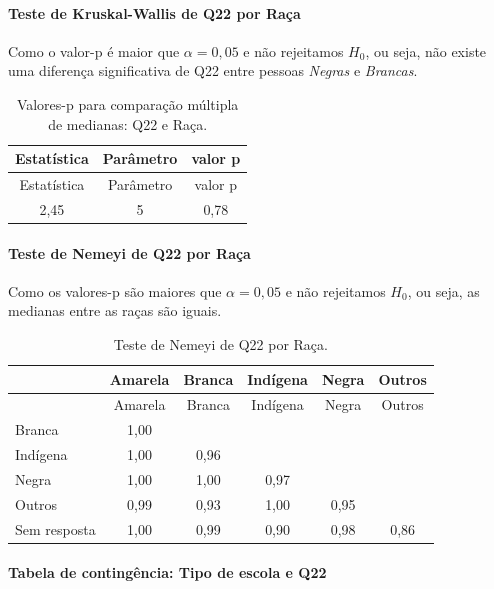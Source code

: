 \documentclass[]{article}
\let\oldparagraph\paragraph
\renewcommand{\paragraph}[1]{\oldparagraph{#1}\mbox{}}
\begin{document}
\hypertarget{teste-de-kruskal-wallis-de-q22-por-rauxe7a}{%
\paragraph{Teste de Kruskal-Wallis de Q22 por Raça}\label{teste-de-kruskal-wallis-de-q22-por-rauxe7a}}

Como o valor-p é maior que \(\alpha=0,05\) e não rejeitamos \(H_0\), ou seja, não existe uma diferença significativa de Q22 entre pessoas \emph{Negras} e \emph{Brancas}.

\begin{longtable}[]{@{}ccc@{}}
\caption{\label{tab:unnamed-chunk-397}Valores-p para comparação múltipla de medianas: Q22 e Raça.}\tabularnewline
\toprule
Estatística & Parâmetro & valor p\tabularnewline
\midrule
\endfirsthead
\toprule
Estatística & Parâmetro & valor p\tabularnewline
\midrule
\endhead
2,45 & 5 & 0,78\tabularnewline
\bottomrule
\end{longtable}

\hypertarget{teste-de-nemeyi-de-q22-por-rauxe7a}{%
\paragraph{Teste de Nemeyi de Q22 por Raça}\label{teste-de-nemeyi-de-q22-por-rauxe7a}}

Como os valores-p são maiores que \(\alpha=0,05\) e não rejeitamos \(H_0\), ou seja, as medianas entre as raças são iguais.

\begin{longtable}[]{@{}lccccc@{}}
\caption{\label{tab:unnamed-chunk-398}Teste de Nemeyi de Q22 por Raça.}\tabularnewline
\toprule
& Amarela & Branca & Indígena & Negra & Outros\tabularnewline
\midrule
\endfirsthead
\toprule
& Amarela & Branca & Indígena & Negra & Outros\tabularnewline
\midrule
\endhead
Branca & 1,00 & & & &\tabularnewline
Indígena & 1,00 & 0,96 & & &\tabularnewline
Negra & 1,00 & 1,00 & 0,97 & &\tabularnewline
Outros & 0,99 & 0,93 & 1,00 & 0,95 &\tabularnewline
Sem resposta & 1,00 & 0,99 & 0,90 & 0,98 & 0,86\tabularnewline
\bottomrule
\end{longtable}

\cleardoublepage

\hypertarget{tabela-de-continguxeancia-tipo-de-escola-e-q22}{%
\paragraph{Tabela de contingência: Tipo de escola e Q22}\label{tabela-de-continguxeancia-tipo-de-escola-e-q22}}
\end{document}
